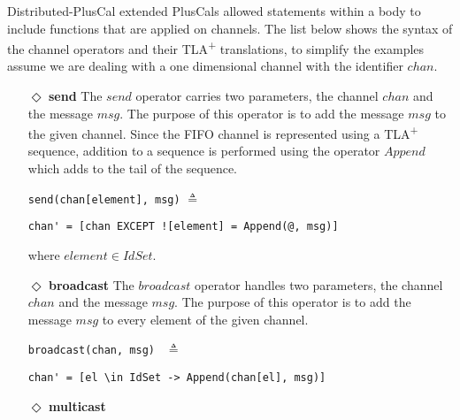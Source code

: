 \documentclass{thesul}
\newcommand{\tlaplus}{TLA\textsuperscript{+}\xspace}
\begin{document}
Distributed-PlusCal extended PlusCals allowed statements within a body to include functions that are applied on channels.
The list below shows the syntax of the channel operators and their \tlaplus translations, to simplify the examples assume we are dealing with a one dimensional channel with the identifier $chan$.

\begin{itemize}

\item[$\Diamond$]  \textbf{send} The $send$ operator carries two parameters, the channel $chan$ and the message $msg$. The purpose of this operator is to add the message $msg$ to
the given channel. Since the FIFO channel is represented using a \tlaplus sequence, addition to a sequence is performed using the operator $Append$ which adds to the tail of the sequence.

\begin{minipage}{.3\textwidth}

\lstinline|send(chan[element], msg)| $\triangleq$
\end{minipage}\hfill
\begin{minipage}{.7\textwidth}
\begin{lstlisting}[frame = none, numbers = none]
chan' = [chan EXCEPT ![element] = Append(@, msg)]\end{lstlisting}

\end{minipage}\hfill
where $element \in IdSet$.


\item[$\Diamond$]  \textbf{broadcast}
The $broadcast$ operator handles two parameters, the channel $chan$ and the message $msg$. The purpose of this operator is to add the message $msg$ to every element of the given channel.

\begin{minipage}{.25\textwidth}

\lstinline|broadcast(chan, msg) | $\triangleq$
\end{minipage}\hfill
\begin{minipage}{.7\textwidth}
\begin{lstlisting}[frame = none, numbers = none]
chan' = [el \in IdSet -> Append(chan[el], msg)]
\end{lstlisting}

\end{minipage}\hfill

\item[$\Diamond$] \textbf{multicast}


\end{itemize}
\end{document}
